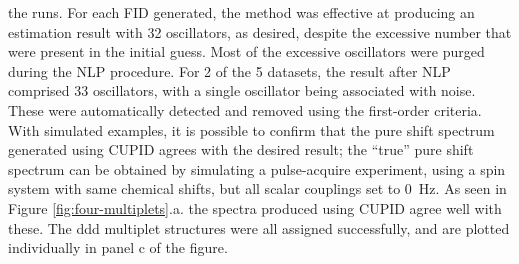 the runs. For each \ac{FID} generated, the method was effective at producing an
estimation result with 32 oscillators, as desired, despite the excessive number
that were present in the initial guess. Most of the excessive oscillators were
purged during the \ac{NLP} procedure.
For 2 of the 5 datasets, the result after \ac{NLP} comprised 33
oscillators, with a single oscillator being associated with noise. These were
automatically detected and removed using the first-order criteria. With
simulated examples, it is possible to confirm that the pure shift spectrum
generated using \ac{CUPID} agrees with the desired result;
the ``true'' pure shift spectrum can be obtained by simulating a pulse-acquire
experiment, using a spin system with same chemical shifts, but all scalar
couplings set to \qty{0}{\hertz}. As seen in Figure
\ref{fig:four-multiplets}.a. the spectra produced using \ac{CUPID} agree well
with these. The ddd multiplet structures were all assigned successfully, and
are plotted individually in panel c of the figure.


